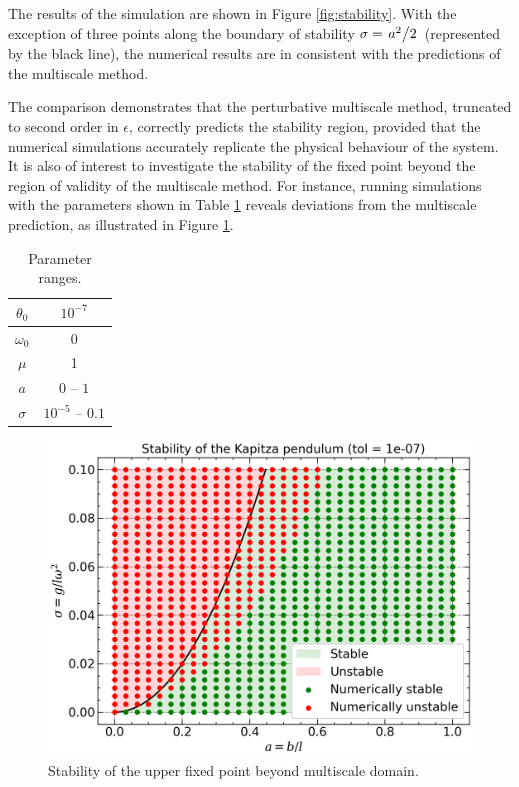 The results of the simulation are shown in Figure \ref{fig:stability}. With the exception of three points along the boundary of stability $\sigma = \flatfrac{a^2}{2}$ (represented by the black line), the numerical results are in consistent with the predictions of the multiscale method.



The comparison demonstrates that the perturbative multiscale method, truncated to second order in $\epsilon$, correctly predicts the stability region, provided that the numerical simulations accurately replicate the physical behaviour of the system. It is also of interest to investigate the stability of the fixed point beyond the region of validity of the multiscale method. For instance, running simulations with the parameters shown in Table \ref{tab:pars2} reveals deviations from the multiscale prediction, as illustrated in Figure \ref{fig:phys_stab}.

\begin{table}[h]
    \centering
    \begin{tabular}{|c|c|} \hline 
        $\theta_0$ & $10^{-7}$ \\ \hline 
        $\omega_0$ & 0 \\ \hline 
         $\mu$& 1 \\ \hline
         $a$&  $0$ -- $1$\\ \hline
         $\sigma$&  $10^{-5}$ -- $0.1$\\ \hline
    \end{tabular}
    \caption{Parameter ranges.}
    \label{tab:pars2}
\end{table}

\begin{figure}[h]
    \centering
    \includegraphics[width=0.75\linewidth]{Images/stability_1e-07.png}
    \caption{Stability of the upper fixed point beyond multiscale domain.}
    \label{fig:phys_stab}
\end{figure}

